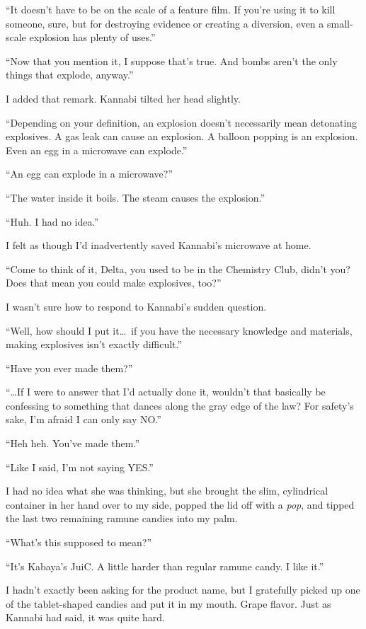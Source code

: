 \documentclass[
    a4paper,
    12pt,
    twoside,
    openany,
    UTF8,
    fontset=windows
]{ctexbook}
\begin{document}
``It doesn't have to be on the scale of a feature film. If you're using it to kill someone, sure, but for destroying evidence or creating a diversion, even a small-scale explosion has plenty of uses.''

``Now that you mention it, I suppose that's true. And bombs aren't the only things that explode, anyway.''

I added that remark. Kannabi tilted her head slightly.

``Depending on your definition, an explosion doesn't necessarily mean detonating explosives. A gas leak can cause an explosion. A balloon popping is an explosion. Even an egg in a microwave can explode.''

``An egg can explode in a microwave?''

``The water inside it boils. The steam causes the explosion.''

``Huh. I had no idea.''

I felt as though I'd inadvertently saved Kannabi's microwave at home.

``Come to think of it, Delta, you used to be in the Chemistry Club, didn't you? Does that mean you could make explosives, too?''

I wasn't sure how to respond to Kannabi's sudden question.

``Well, how should I put it\dots\ if you have the necessary knowledge and materials, making explosives isn't exactly difficult.''

``Have you ever made them?''

``\dots If I were to answer that I'd actually done it, wouldn't that basically be confessing to something that dances along the gray edge of the law? For safety's sake, I'm afraid I can only say NO.''

``Heh heh. You've made them.''

``Like I said, I'm not saying YES.''

I had no idea what she was thinking, but she brought the slim, cylindrical container in her hand over to my side, popped the lid off with a \textit{pop}, and tipped the last two remaining ramune candies into my palm.

``What's this supposed to mean?''

``It's Kabaya's JuiC. A little harder than regular ramune candy. I like it.''

I hadn't exactly been asking for the product name, but I gratefully picked up one of the tablet-shaped candies and put it in my mouth. Grape flavor. Just as Kannabi had said, it was quite hard.
\end{document}
